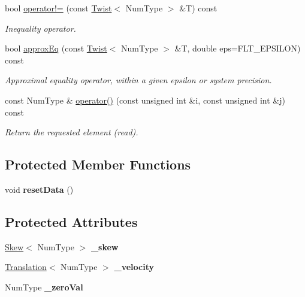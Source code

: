 \begin{DoxyCompactItemize}
bool \hyperlink{singletonscrews_1_1_twist_a08fcff2ea99ebc2c55df1ce70d51647e}{operator!=} (const \hyperlink{singletonscrews_1_1_twist}{Twist}$<$ Num\+Type $>$ \&T) const 
\begin{DoxyCompactList}\small\item\em Inequality operator. \end{DoxyCompactList}\item 
bool \hyperlink{singletonscrews_1_1_twist_ae7415c662005a6616f98ca2389e5beb0}{approx\+Eq} (const \hyperlink{singletonscrews_1_1_twist}{Twist}$<$ Num\+Type $>$ \&T, double eps=F\+L\+T\+\_\+\+E\+P\+S\+I\+L\+O\+N) const 
\begin{DoxyCompactList}\small\item\em Approximal equality operator, within a given epsilon or system precision. \end{DoxyCompactList}\item 
const Num\+Type \& \hyperlink{singletonscrews_1_1_twist_ac5e9f16ced07c5cd03338b4f6a3ec788}{operator()} (const unsigned int \&i, const unsigned int \&j) const 
\begin{DoxyCompactList}\small\item\em Return the requested element (read). \end{DoxyCompactList}\end{DoxyCompactItemize}
\subsection*{Protected Member Functions}
\begin{DoxyCompactItemize}
\item 
\hypertarget{singletonscrews_1_1_twist_a71eb764b1eb5702635b864410a15e01f}{void {\bfseries reset\+Data} ()}\label{singletonscrews_1_1_twist_a71eb764b1eb5702635b864410a15e01f}

\end{DoxyCompactItemize}
\subsection*{Protected Attributes}
\begin{DoxyCompactItemize}
\item 
\hypertarget{singletonscrews_1_1_twist_a7e0d1d4d4e1dbb2ad2b247f17b70d9ec}{\hyperlink{singletonscrews_1_1_skew}{Skew}$<$ Num\+Type $>$ {\bfseries \+\_\+skew}}\label{singletonscrews_1_1_twist_a7e0d1d4d4e1dbb2ad2b247f17b70d9ec}

\item 
\hypertarget{singletonscrews_1_1_twist_afaadf2123fb3dfe8594f9cd11a10edf4}{\hyperlink{singletonscrews_1_1_translation}{Translation}$<$ Num\+Type $>$ {\bfseries \+\_\+velocity}}\label{singletonscrews_1_1_twist_afaadf2123fb3dfe8594f9cd11a10edf4}

\item 
\hypertarget{singletonscrews_1_1_twist_a0d89a01bdaf6e7e6fbc04edaed4e115a}{Num\+Type {\bfseries \+\_\+zero\+Val}}\label{singletonscrews_1_1_twist_a0d89a01bdaf6e7e6fbc04edaed4e115a}

\end{DoxyCompactItemize}
